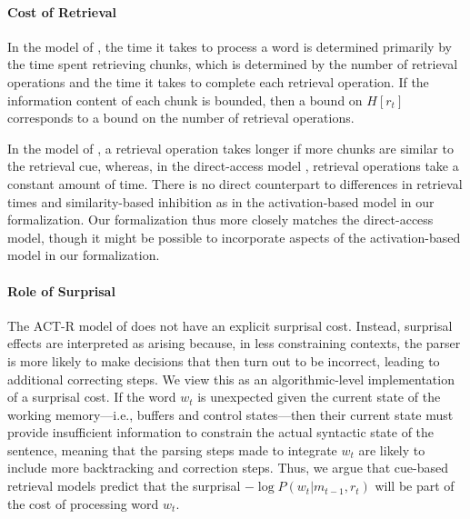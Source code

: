 \documentclass[11pt,letterpaper]{article}
\begin{document}
\paragraph{Cost of Retrieval}
In the model of \cite{lewis-activation-based-2005}, the time it takes to process a word is determined primarily by the time spent retrieving chunks, which is determined by the number of retrieval operations and the time it takes to complete each retrieval operation.
If the information content of each chunk is bounded, then a bound on $H[r_t]$ corresponds to a bound on the number of retrieval operations.

In the model of \cite{lewis-activation-based-2005}, a retrieval operation takes longer if more chunks are similar to the retrieval cue, whereas, in the direct-access model \citep{mcelree2000sentence,nicenboim2018models,vasishth2019computational}, retrieval operations take a constant amount of time.
There is no direct counterpart to differences in retrieval times and similarity-based inhibition as in the activation-based model in our formalization.
Our formalization thus more closely matches the direct-access model, though it might be possible to incorporate aspects of the activation-based model in our formalization.

\paragraph{Role of Surprisal}
The ACT-R model of \cite{lewis-activation-based-2005} does not have an explicit surprisal cost.
Instead, surprisal effects are interpreted as arising because, in less constraining contexts, the parser is more likely to make decisions that then turn out to be incorrect, leading to additional correcting steps.
We view this as an algorithmic-level implementation of a surprisal cost.
If the word $w_t$ is unexpected given the current state of the working memory---i.e., buffers and control states---then their current state must provide insufficient information to constrain the actual syntactic state of the sentence, meaning that the parsing steps made to integrate $w_t$ are likely to include more backtracking and correction steps.
Thus, we argue that cue-based retrieval models predict that the surprisal $- \log P(w_t|m_{t-1}, r_t)$ will be part of the cost of processing word $w_t$.
\end{document}
